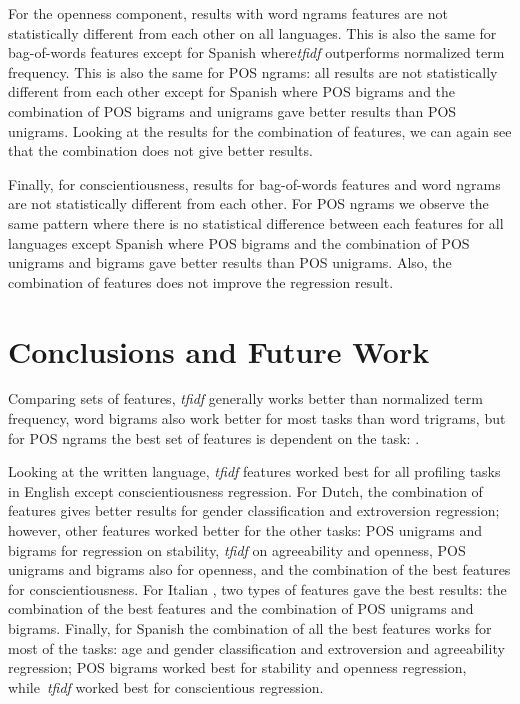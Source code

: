 \documentclass[a4paper]{llncs}
\begin{document}
For the openness component, results with word ngrams features are not statistically different from each other on all languages. This is also the same for bag-of-words features except for Spanish where\textit{tfidf} outperforms normalized term frequency. This is also the same for POS ngrams: all results are not statistically different from each other except for Spanish where POS bigrams and the combination of POS bigrams and unigrams gave better results than POS unigrams. Looking at the results for the combination of features, we can again see that the combination does not give better results. 

Finally, for conscientiousness, results for bag-of-words features and word ngrams are not statistically different from each other. For POS ngrams we observe the same pattern where there is no statistical difference between each features for all languages except Spanish where POS bigrams and the combination of POS unigrams and bigrams gave better results than POS unigrams. Also, the combination of features does not improve the regression result.



\section{Conclusions and Future Work}
Comparing sets of features, \textit{tfidf} generally works better than normalized term frequency, word bigrams also work better for most tasks than word trigrams, but for POS ngrams the best set of features is dependent on the task: . 

Looking at the written language, \textit{tfidf} features worked best for all profiling tasks in English except conscientiousness regression. For Dutch, the combination of features gives better results for gender classification and extroversion regression; however, other features worked better for the other tasks: POS unigrams and bigrams for regression on stability, \textit{tfidf} on agreeability and openness, POS unigrams and bigrams also for openness, and the combination of the best features for conscientiousness. For Italian , two types of features gave the best results: the combination of the best features and the combination of POS unigrams and bigrams. Finally, for Spanish the combination of all the best features works for most of the tasks: age and gender classification and extroversion and agreeability regression; POS bigrams worked best for stability and openness regression, while~\textit{tfidf} worked best for conscientious regression.
\end{document}
